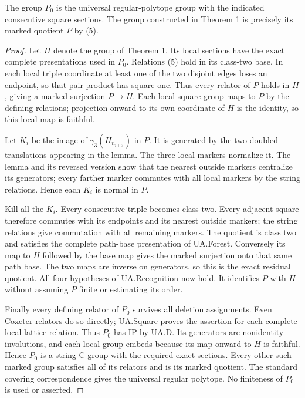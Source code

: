 \begin{theorem}
The group $P_0$ is the universal regular-polytope group with the indicated
consecutive square sections. The group constructed in Theorem 1 is precisely
its marked quotient $P$ by (5).
\end{theorem}
\begin{proof}
Let $H$ denote the group of Theorem 1. Its local sections have the exact
complete presentations used in $P_0$. Relations (5) hold in its class-two
base. In each local triple coordinate at least one of the two disjoint
edges loses an endpoint, so that pair product has square one. Thus every
relator of $P$ holds in $H$, giving a marked surjection $P\to H$.
Each local square group maps to $P$ by the defining relations; projection
onward to its own coordinate of $H$ is the identity, so this local map is
faithful.

Let $K_i$ be the image of $\gamma_3(H_{n_{i+3}})$ in $P$. It is generated
by the two doubled translations appearing in the lemma. The three local
markers normalize it. The lemma and its reversed version show that the
nearest outside markers centralize its generators; every farther marker
commutes with all local markers by the string relations. Hence each
$K_i$ is normal in $P$.

Kill all the $K_i$. Every consecutive triple becomes class two. Every
adjacent square therefore commutes with its endpoints and its nearest
outside markers; the string relations give commutation with all remaining
markers. The quotient is class two and satisfies the complete path-base
presentation of UA.Forest. Conversely its map to $H$ followed by the base
map gives the marked surjection onto that same path base. The two maps are
inverse on generators, so this is the exact residual quotient. All four
hypotheses of UA.Recognition now hold. It identifies $P$ with $H$ without
assuming $P$ finite or estimating its order.

Finally every defining relator of $P_0$ survives all deletion assignments.
Even Coxeter relators do so directly; UA.Square proves the assertion for
each complete local lattice relation. Thus $P_0$ has IP by UA.D. Its
generators are nonidentity involutions, and each local group embeds because
its map onward to $H$ is faithful. Hence $P_0$ is a string C-group with
the required exact sections. Every other such marked group satisfies all
of its relators and is its marked quotient. The standard covering
correspondence gives the universal regular polytope. No finiteness of
$P_0$ is used or asserted.
\end{proof}

